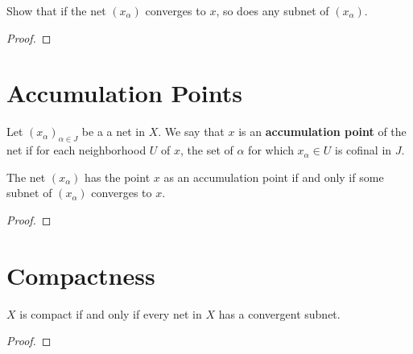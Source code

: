 \documentclass[12pt]{article}
\begin{document}
Show that if the net $(x_\alpha)$ converges to $x$, so does any subnet of $(x_\alpha)$.
\begin{proof}
\end{proof}

\section{Accumulation Points}
\begin{defn}
    Let ${(x_\alpha)}_{\alpha\in J}$ be a a net in $X$. We say that $x$ is an \textbf{accumulation point} of the net if for each neighborhood $U$ of $x$, the set of $\alpha$ for which $x_\alpha \in U$ is cofinal in $J$.
\end{defn}

\begin{lemma}
    The net $(x_\alpha)$ has the point $x$ as an accumulation point if and only if some subnet of $(x_\alpha)$ converges to $x$.
\end{lemma}
\begin{proof}
\end{proof}

\section{Compactness}
\begin{thm}
    $X$ is compact if and only if every net in $X$ has a convergent subnet.
\end{thm}
\begin{proof}
\end{proof}
\end{document}
